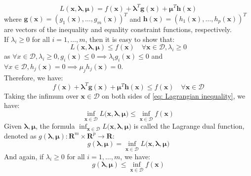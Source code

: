 \begin{equation}
    L(\mathbf{x}, \boldsymbol{\lambda}, \boldsymbol{\mu}) = f(\mathbf{x}) + \boldsymbol{\lambda}^T \mathbf{g}(\mathbf{x}) + \boldsymbol{\mu}^T \mathbf{h}(\mathbf{x})
\end{equation}
where $\mathbf{g}(\mathbf{x}) = (g_1(\mathbf{x}), \ldots, g_m(\mathbf{x}))^T$ and $\mathbf{h}(\mathbf{x}) = (h_1(\mathbf{x}), \ldots, h_p(\mathbf{x}))^T$ are vectors of the inequality and equality constraint functions, respectively.\\
If $\lambda_i \geq 0$ for all $i = 1, \ldots, m$, then it is easy to show that:
\begin{equation}
    L(\mathbf{x}, \boldsymbol{\lambda}, \boldsymbol{\mu}) \leq f(\mathbf{x}) \quad \forall \mathbf{x} \in \mathcal{D}, \lambda_i \geq 0
    \label{eq: Lagrangian inequality}
\end{equation}
as $\forall x \in \mathcal{D}, \lambda_i \geq 0, g_i(\mathbf{x}) \leq 0 \implies \lambda_i g_i(\mathbf{x}) \leq 0$ and $\forall x \in \mathcal{D}, h_j(\mathbf{x}) = 0 \implies \mu_j h_j(\mathbf{x}) = 0$.\\
Therefore, we have:
\begin{equation}
    f(\mathbf{x}) + \boldsymbol{\lambda}^T \mathbf{g}(\mathbf{x}) + \boldsymbol{\mu}^T \mathbf{h}(\mathbf{x}) \leq f(\mathbf{x}) \quad \forall \mathbf{x} \in \mathcal{D}
\end{equation}
Taking the infimum over $\mathbf{x} \in \mathcal{D}$ on both sides of \ref{eq: Lagrangian inequality}, we have:
\begin{equation}
    \inf_{\mathbf{x} \in \mathcal{D}} L(\mathbf{x, \boldsymbol{\lambda}, \boldsymbol{\mu})} \leq \inf_{\mathbf{x} \in \mathcal{D}} f(\mathbf{x})
\end{equation}
Given $\boldsymbol{\lambda}, \boldsymbol{\mu}$, the formula $\inf_{\mathbf{x} \in \mathcal{D}} L(\mathbf{x, \boldsymbol{\lambda}, \boldsymbol{\mu})}$ is called the Lagrange dual function, denoted as $g(\boldsymbol{\lambda}, \boldsymbol{\mu}): \mathbf{R}^m \times \mathbf{R}^p \to \mathbf{R}$:
\begin{equation}
    g(\boldsymbol{\lambda}, \boldsymbol{\mu}) = \inf_{\mathbf{x} \in \mathcal{D}} L(\mathbf{x, \boldsymbol{\lambda}, \boldsymbol{\mu})}
\end{equation}
And again, if $\lambda_i \geq 0$ for all $i = 1, \ldots, m$, we have:
\begin{equation}
    g(\boldsymbol{\lambda}, \boldsymbol{\mu}) \leq \inf_{\mathbf{x} \in \mathcal{D}} f(\mathbf{x})
\end{equation}